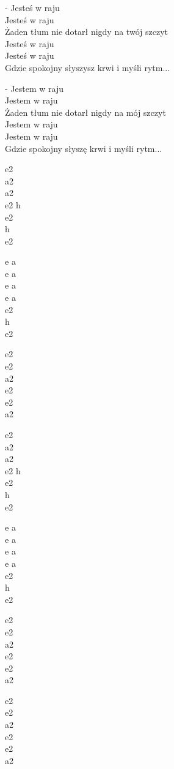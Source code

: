 \begin{text}
    - Jesteś w raju\\
    Jesteś w raju\\
    Żaden tłum nie dotarł nigdy na twój szczyt\\
    Jesteś w raju\\
    Jesteś w raju\\
    Gdzie spokojny słyszysz krwi i myśli rytm...

    - Jestem w raju\\
    Jestem w raju\\
    Żaden tłum nie dotarł nigdy na mój szczyt\\
    Jestem w raju\\
    Jestem w raju\\
    Gdzie spokojny słyszę krwi i myśli rytm...
\end{text}
\begin{chord}
    e2\\
    a2\\
    a2\\
    e2 h\\
    e2\\
    h\\
    e2

    e a\\
    e a\\
    e a\\
    e a\\
    e2\\
    h\\
    e2

    e2\\
    e2\\
    a2\\
    e2\\
    e2\\
    a2

    e2\\
    a2\\
    a2\\
    e2 h\\
    e2\\
    h\\
    e2

    e a\\
    e a\\
    e a\\
    e a\\
    e2\\
    h\\
    e2

    e2\\
    e2\\
    a2\\
    e2\\
    e2\\
    a2

    e2\\
    e2\\
    a2\\
    e2\\
    e2\\
    a2
\end{chord}